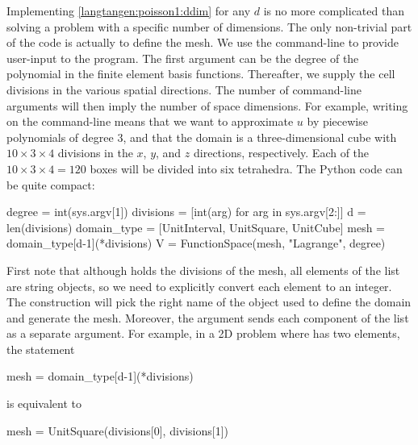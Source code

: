 Implementing \eqref{langtangen:poisson1:ddim} for any $d$ is no more
complicated than solving a problem with a specific number of dimensions.
The only non-trivial part of the code is actually to define the mesh.
We use the command-line to provide user-input to the program. The first argument
can be the degree of the polynomial in the finite element basis functions.
Thereafter, we supply the
cell divisions in the various spatial directions. The number of
command-line arguments will then imply the number of space dimensions.
For example, writing  on the command-line means that
we want to approximate $u$ by piecewise polynomials of degree 3,
and that the domain is a three-dimensional cube with $10\times 3\times 4$
divisions in the $x$, $y$, and $z$ directions, respectively.
Each of the $10\times 3\times 4 = 120$ boxes will
be divided into six tetrahedra.
The Python code can be quite compact:
\begin{python}
degree = int(sys.argv[1])
divisions = [int(arg) for arg in sys.argv[2:]]
d = len(divisions)
domain_type = [UnitInterval, UnitSquare, UnitCube]
mesh = domain_type[d-1](*divisions)
V = FunctionSpace(mesh, "Lagrange", degree)
\end{python}
First note that although  holds the divisions of
the mesh, all elements of the list  are string objects,
so we need to explicitly convert each element to an integer.
The construction  will pick the right name of the
object used to define the domain and generate the mesh.
Moreover, the argument 
sends each component of the list  as a separate
argument. For example, in a 2D problem where  has
two elements, the statement
\begin{python}
mesh = domain_type[d-1](*divisions)
\end{python}
is equivalent to
\begin{python}
mesh = UnitSquare(divisions[0], divisions[1])
\end{python}

